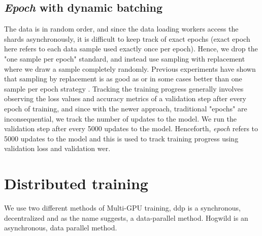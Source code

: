 \subsection{\emph{Epoch} with dynamic batching}
The data is in random order, and since the data loading workers access the shards asynchronously, it is difficult to keep track of exact epochs (exact epoch here refers to each data sample used exactly once per epoch). Hence, we drop the "one sample per epoch" standard, and instead use sampling with replacement where we draw a sample completely randomly. Previous experiments have shown that sampling by replacement is as good as or in some cases better than one sample per epoch strategy \cite{Recht2012BeneathConsequences, Nielsen2015NeuralLearning}. Tracking the training progress generally involves observing the loss values and accuracy metrics of a validation step after every epoch of training, and since with the newer approach, traditional "epochs" are inconsequential, we track the number of updates to the model. We run the validation step after every 5000 updates to the model. Henceforth, \emph{epoch} refers to 5000 updates to the model and this is used to track training progress using validation loss and validation \acrshort{wer}.

\section{Distributed training}
\label{section:di}
We use two different methods of Multi-GPU training, \acrfull{ddp} is a synchronous, decentralized and as the name suggests, a data-parallel method. Hogwild is an asynchronous, data parallel method. 


